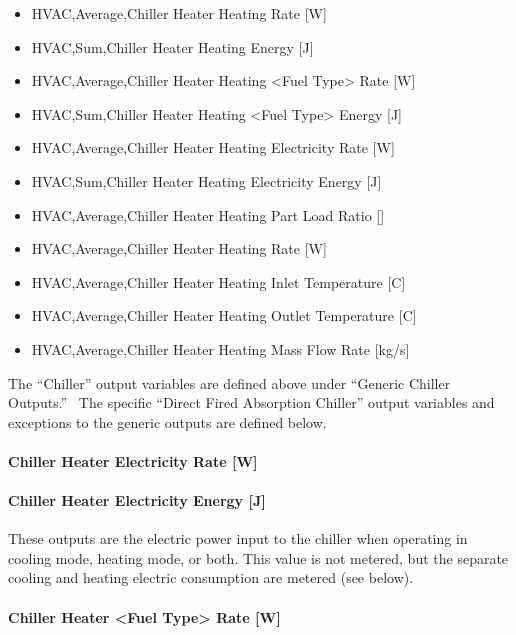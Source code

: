 \begin{itemize}
\item
  HVAC,Average,Chiller Heater Heating Rate {[}W{]}
\item
  HVAC,Sum,Chiller Heater Heating Energy {[}J{]}
\item
  HVAC,Average,Chiller Heater Heating \textless{}Fuel Type\textgreater{} Rate {[}W{]}
\item
  HVAC,Sum,Chiller Heater Heating \textless{}Fuel Type\textgreater{} Energy {[}J{]}
\item
  HVAC,Average,Chiller Heater Heating Electricity Rate {[}W{]}
\item
  HVAC,Sum,Chiller Heater Heating Electricity Energy {[}J{]}
\item
  HVAC,Average,Chiller Heater Heating Part Load Ratio {[]}
\item
  HVAC,Average,Chiller Heater Heating Rate {[}W{]}
\item
  HVAC,Average,Chiller Heater Heating Inlet Temperature {[}C{]}
\item
  HVAC,Average,Chiller Heater Heating Outlet Temperature {[}C{]}
\item
  HVAC,Average,Chiller Heater Heating Mass Flow Rate {[}kg/s{]}
\end{itemize}

The ``Chiller'' output variables are defined above under ``Generic Chiller Outputs.''~ The specific ``Direct Fired Absorption Chiller'' output variables and exceptions to the generic outputs are defined below.

\paragraph{Chiller Heater Electricity Rate {[}W{]}}\label{chiller-heater-electric-power-w}

\paragraph{Chiller Heater Electricity Energy {[}J{]}}\label{chiller-heater-electric-energy-j}

These outputs are the electric power input to the chiller when operating in cooling mode, heating mode, or both. This value is not metered, but the separate cooling and heating electric consumption are metered (see below).

\paragraph{Chiller Heater \textless{}Fuel Type\textgreater{} Rate {[}W{]}}\label{chiller-heater-fuel-type-rate-w}

